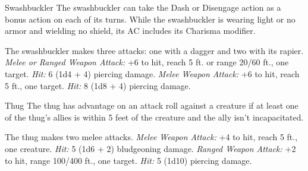 \documentclass[10pt,a4paper,twoside,twocolumn,openany,bg=print,nodeprecatedcode]{dndbook}
\begin{document}
\begin{DndMonster}[float*=t]{Swashbuckler}
\DndMonsterBasics[
armor-class = {17 (leather armor)},
hit-points = {\DndDice{12d8 + 12}},
speed = {30 ft.}
]
\DndMonsterAbilityScores[
 str = 12,
 dex = 18,
 con = 12,
 int = 14,
 wis = 11,
 cha = 15
]
\DndMonsterDetails[
skills = {Acrobatics +8, Athletics +5, Persuasion +6},
languages = {any one language (usually Common)},
challenge = 3,
]
The swashbuckler can take the Dash or Disengage action as a bonus action on each of its turns.
While the swashbuckler is wearing light or no armor and wielding no shield, its AC includes its Charisma modifier.
\par
{}
The swashbuckler makes three attacks: one with a dagger and two with its rapier.
\textsl{Melee or Ranged Weapon Attack:} +6 to hit, reach 5 ft. or range 20/60 ft., one target. \textsl{Hit:} 6 (1d4 + 4) piercing damage.
\textsl{Melee Weapon Attack:} +6 to hit, reach 5 ft., one target. \textsl{Hit:} 8 (1d8 + 4) piercing damage.
\end{DndMonster}



\begin{DndMonster}[float*=t]{Thug}
\DndMonsterBasics[
armor-class = {11 (leather armor)},
hit-points = {\DndDice{5d8 + 10}},
speed = {30 ft.}
]
\DndMonsterAbilityScores[
 str = 15,
 dex = 11,
 con = 14,
 int = 10,
 wis = 10,
 cha = 11
]
\DndMonsterDetails[
skills = {Intimidation +2},
languages = {any one language (usually Common)},
challenge = 1/2,
]
The thug has advantage on an attack roll against a creature if at least one of the thug's allies is within 5 feet of the creature and the ally isn't incapacitated.
\par
{}
The thug makes two melee attacks.
\textsl{Melee Weapon Attack:} +4 to hit, reach 5 ft., one creature. \textsl{Hit:} 5 (1d6 + 2) bludgeoning damage.
\textsl{Ranged Weapon Attack:} +2 to hit, range 100/400 ft., one target. \textsl{Hit:} 5 (1d10) piercing damage.
\end{DndMonster}
\end{document}
